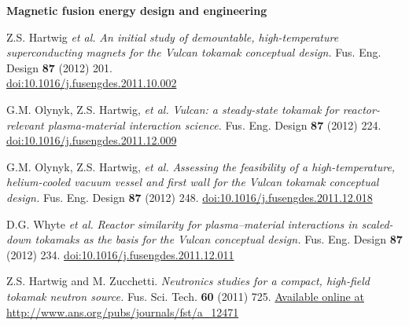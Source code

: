 \documentclass[10pt]{article}
\begin{document}
\textbf{Magnetic fusion energy design and engineering}
\begin{innerlist}
\item Z.S. Hartwig \textit{et al.} \textit{An initial study of
  demountable, high-temperature superconducting magnets for the Vulcan
  tokamak conceptual design.} Fus. Eng. Design \textbf{87} (2012) 201.
  \\\href{http://dx.doi.org/10.1016/j.fusengdes.2011.10.002}{doi:10.1016/j.fusengdes.2011.10.002}
  \vspace{0.2cm}

\item G.M. Olynyk, Z.S. Hartwig, \textit{et al.} \textit{Vulcan: a
  steady-state tokamak for reactor-relevant plasma-material
  interaction science.} Fus. Eng. Design \textbf{87} (2012) 224.
  \href{http://dx.doi.org/10.1016/j.fusengdes.2011.12.009}{doi:10.1016/j.fusengdes.2011.12.009}
  \vspace{0.2cm}

\item G.M. Olynyk, Z.S. Hartwig, \textit{et al.} \textit{Assessing the
  feasibility of a high-temperature, helium-cooled vacuum vessel and
  first wall for the Vulcan tokamak conceptual design.} Fus. Eng. Design \textbf{87} (2012) 248.
  \href{http://dx.doi.org/10.1016/j.fusengdes.2011.12.018}{doi:10.1016/j.fusengdes.2011.12.018}
  \vspace{0.2cm}

\item D.G. Whyte \textit{et al.} \textit{Reactor similarity for
  plasma--material interactions in scaled-down tokamaks as the basis
  for the Vulcan conceptual design.} Fus. Eng. Design \textbf{87} (2012) 234.
  \href{http://dx.doi.org/10.1016/j.fusengdes.2011.12.011}{doi:10.1016/j.fusengdes.2011.12.011}\vspace{0.2cm}

\item Z.S. Hartwig and M. Zucchetti. \textit{Neutronics studies for a
  compact, high-field tokamak neutron source.}
  Fus. Sci. Tech. \textbf{60} (2011)
  725. \href{http://www.ans.org/pubs/journals/fst/a_12471}{Available online at http://www.ans.org/pubs/journals/fst/a\_12471}
\end{innerlist}

\vspace{0.5cm}
\end{document}
